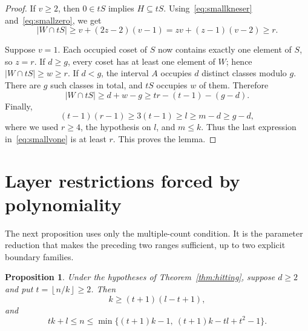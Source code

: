 \documentclass[11pt,a4paper]{article}
\numberwithin{equation}{section}
\newtheorem{proposition}[theorem]{Proposition}
\theoremstyle{remark}
\newcommand{\floor}[1]{\left\lfloor #1\right\rfloor}
\begin{document}
\begin{proof}
If $v\ge2$, then $0\in tS$ implies $H\subseteq tS$.
Using~\eqref{eq:smallkneser} and~\eqref{eq:smallzero}, we get
\begin{equation}\label{eq:smallvlarge}
  |W\cap tS|
  \ge v+(2z-2)(v-1)
  =zv+(z-1)(v-2)\ge r.
\end{equation}

Suppose $v=1$. Each occupied coset of $S$ now contains exactly one
element of $S$, so $z=r$.
If $d\ge g$, every coset has at least one element of $W$; hence
$|W\cap tS|\ge w\ge r$.
If $d<g$, the interval $A$ occupies $d$ distinct classes modulo $g$.
There are $g$ such classes in total, and $tS$ occupies $w$ of them.
Therefore
\begin{equation}\label{eq:smallvone}
  |W\cap tS|\ge d+w-g
  \ge tr-(t-1)-(g-d).
\end{equation}
Finally,
\[
  (t-1)(r-1)\ge3(t-1)\ge l\ge m-d\ge g-d,
\]
where we used $r\ge4$, the hypothesis on $l$, and $m\le k$.
Thus the last expression in~\eqref{eq:smallvone} is at least $r$.
This proves the lemma.
\end{proof}

\section{Layer restrictions forced by polynomiality}\label{sec:layers}

The next proposition uses only the multiple-count condition.
It is the parameter reduction that makes the preceding two ranges
sufficient, up to two explicit boundary families.

\begin{proposition}\label{prop:layers}
Under the hypotheses of Theorem~\ref{thm:hitting}, suppose $d\ge2$
and put $t=\floor{n/k}\ge2$. Then
\begin{equation}\label{eq:layerk}
  k\ge(t+1)(l-t+1),
\end{equation}
and
\begin{equation}\label{eq:layern}
  tk+l\le n\le
  \min\{(t+1)k-1,\ (t+1)k-tl+t^2-1\}.
\end{equation}
\end{proposition}
\end{document}
